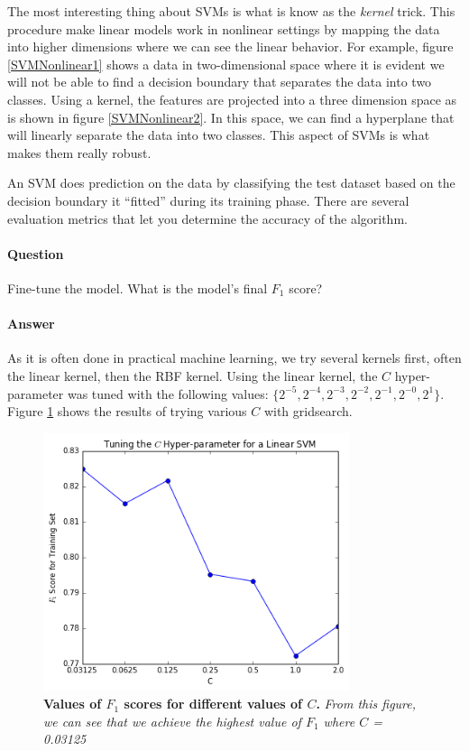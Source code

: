 \documentclass[12pt]{article}
\begin{document}
The most interesting thing about SVMs is what is know as the \textit{kernel} trick. This procedure make linear models work in nonlinear settings by mapping the data into higher dimensions where we can see the linear behavior. For example, figure \ref{SVMNonlinear1} shows a data in two-dimensional space where it is evident we will not be able to find a decision boundary that separates the data into two classes. Using a kernel, the features are projected into a three dimension space as is shown in figure \ref{SVMNonlinear2}. In this space, we can find a hyperplane that will linearly separate the data into two classes. This aspect of SVMs is what makes them really robust.

An SVM does prediction on the data by classifying the test dataset based on the decision boundary it ``fitted'' during its training phase. There are several evaluation metrics that let you determine the accuracy of the algorithm.


\paragraph{\textbf{Question}} Fine-tune the model. What is the model's final $F_1$ score?
\paragraph{\textbf{Answer}} As it is often done in practical machine learning, we try several kernels first, often the linear kernel, then the RBF kernel. Using the linear kernel, the $C$ hyper-parameter was tuned with the following values: $ \{2^{-5}, 2^{-4}, 2^{-3}, 2^{-2}, 2^{-1}, 2^{-0}, 2^{1} \}$. Figure \ref{tunedC} shows the results of trying various $C$ with gridsearch. 


\begin{figure}[!htbp]
  \centering
    \includegraphics[width=0.8\textwidth]{images/C_Hyperparameter}
\caption{\textbf{Values of $F_1$ scores for different values of $C$.} \textit{From this figure, we can see that we achieve the highest value of $F_1$ where $C$ = 0.03125}}
\label{tunedC}
\end{figure}
\end{document}
